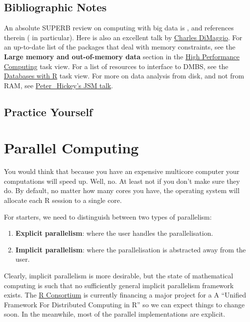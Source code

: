 \documentclass[]{book}
\providecommand{\tightlist}{%
  \setlength{\itemsep}{0pt}\setlength{\parskip}{0pt}}
\theoremstyle{definition}
\theoremstyle{definition}
\theoremstyle{definition}
\theoremstyle{remark}
\begin{document}
\section{Bibliographic Notes}\label{bibliographic-notes-13}

An absolute SUPERB review on computing with big data is
\citet{wang2015statistical}, and references therein
(\citet{kane2013scalable} in particular). Here is also an excellent talk
by
\href{http://www.columbia.edu/~sjm2186/EPIC_R/EPIC_R_BigData.pdf}{Charles
DiMaggio}. For an up-to-date list of the packages that deal with memory
constraints, see the \textbf{Large memory and out-of-memory data}
section in the
\href{https://cran.r-project.org/web/views/HighPerformanceComputing.html}{High
Performance Computing} task view. For a list of resources to interface
to DMBS, see the
\href{https://cran.r-project.org/web/views/Databases.html}{Databases
with R} task view. For more on data analysis from disk, and not from
RAM, see
\href{https://www.peterhickey.org/slides/2017/2017-08-01_Peter_Hickey_JSM.pdf}{Peter\_Hickey's
JSM talk}.

\section{Practice Yourself}\label{practice-yourself-11}

\chapter{Parallel Computing}\label{parallel}

You would think that because you have an expensive multicore computer
your computations will speed up. Well, no. At least not if you don't
make sure they do. By default, no matter how many cores you have, the
operating system will allocate each R session to a single core.

For starters, we need to distinguish between two types of parallelism:

\begin{enumerate}
\def\labelenumi{\arabic{enumi}.}
\tightlist
\item
  \textbf{Explicit parallelism}: where the user handles the
  parallelisation.
\item
  \textbf{Implicit parallelism}: where the parallelisation is abstracted
  away from the user.
\end{enumerate}

Clearly, implicit parallelism is more desirable, but the state of
mathematical computing is such that no sufficiently general implicit
parallelism framework exists. The
\href{https://www.r-consortium.org/projects/awarded-projects}{R
Consortium} is currently financing a major project for a A ``Unified
Framework For Distributed Computing in R'' so we can expect things to
change soon. In the meanwhile, most of the parallel implementations are
explicit.
\end{document}
